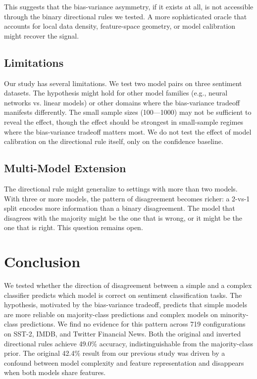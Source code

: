 \documentclass[11pt,letterpaper]{article}
\begin{document}
This suggests that the bias-variance asymmetry, if it exists at all, is not accessible through the binary directional rules we tested. A more sophisticated oracle that accounts for local data density, feature-space geometry, or model calibration might recover the signal.

\subsection{Limitations}

Our study has several limitations. We test two model pairs on three sentiment datasets. The hypothesis might hold for other model families (e.g., neural networks vs. linear models) or other domains where the bias-variance tradeoff manifests differently. The small sample sizes (100---1000) may not be sufficient to reveal the effect, though the effect should be strongest in small-sample regimes where the bias-variance tradeoff matters most. We do not test the effect of model calibration on the directional rule itself, only on the confidence baseline.

\subsection{Multi-Model Extension}

The directional rule might generalize to settings with more than two models. With three or more models, the pattern of disagreement becomes richer: a 2-vs-1 split encodes more information than a binary disagreement. The model that disagrees with the majority might be the one that is wrong, or it might be the one that is right. This question remains open.

\section{Conclusion}

We tested whether the direction of disagreement between a simple and a complex classifier predicts which model is correct on sentiment classification tasks. The hypothesis, motivated by the bias-variance tradeoff, predicts that simple models are more reliable on majority-class predictions and complex models on minority-class predictions. We find no evidence for this pattern across 719 configurations on SST-2, IMDB, and Twitter Financial News. Both the original and inverted directional rules achieve 49.0\% accuracy, indistinguishable from the majority-class prior. The original 42.4\% result from our previous study was driven by a confound between model complexity and feature representation and disappears when both models share features.
\end{document}
